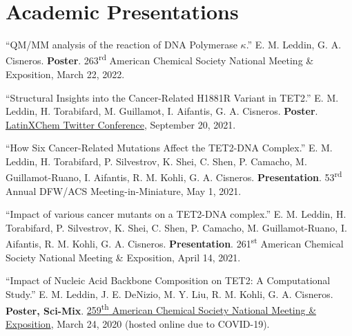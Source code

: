 \documentclass[letterpaper,11pt]{article}
\begin{document}
\section{Academic Presentations}
\begin{etaremune}[start=17]
  \item \textnormal{``QM/MM analysis of the reaction of DNA Polymerase $\kappa$.'' E. M. Leddin, G. A. Cisneros. \textbf{Poster}. 263\textsuperscript{rd} American Chemical Society National Meeting \& Exposition, March 22, 2022.}
  \item \textnormal{``Structural Insights into the Cancer-Related H1881R Variant in TET2.'' E. M. Leddin, H. Torabifard, M. Guillamot, I. Aifantis, G. A. Cisneros. \textbf{Poster}. \href{https://doi.org/10.26226/morressier.616e5c2362ba8657678b1294}{LatinXChem Twitter Conference}, September 20, 2021.}
  \item \textnormal{``How Six Cancer-Related Mutations Affect the
TET2-DNA Complex.'' E. M. Leddin, H. Torabifard, P. Silvestrov, K. Shei, C. Shen, P. Camacho, M. Guillamot-Ruano, I. Aifantis, R. M. Kohli, G. A. Cisneros. \textbf{Presentation}. 53\textsuperscript{rd} Annual DFW/ACS Meeting-in-Miniature, May 1, 2021.}
  \item \textnormal{``Impact of various cancer mutants on a TET2-DNA complex.'' E. M. Leddin, H. Torabifard, P. Silvestrov, K. Shei, C. Shen, P. Camacho, M. Guillamot-Ruano, I. Aifantis, R. M. Kohli, G. A. Cisneros. \textbf{Presentation}. 261\textsuperscript{st} American Chemical Society National Meeting \& Exposition, April 14, 2021.}
  \item \textnormal{``Impact of Nucleic Acid Backbone Composition on TET2: A Computational Study.'' E. M. Leddin, J. E. DeNizio, M. Y. Liu, R. M. Kohli, G. A. Cisneros. \textbf{Poster, Sci-Mix}. \href{https://www.morressier.com/article/impact-nucleic-acid-backbone-composition-tet2-computational-study/5e735fe0cde2b641284a9da2?}{259\textsuperscript{th} American Chemical Society National Meeting \& Exposition}, March 24, 2020 (hosted online due to COVID-19).}

\end{etaremune}
\newpage
\end{document}
